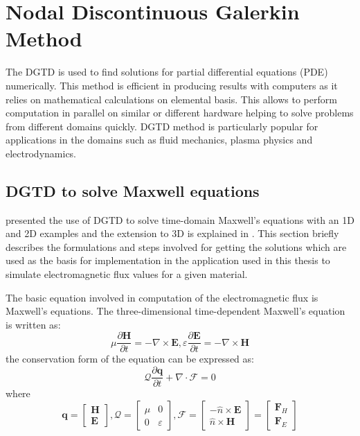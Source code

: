 \section{Nodal Discontinuous Galerkin Method}
\label{sec:dgtd}

The \ac{DGTD} \cite{hesthaven_nodal_2008} is used to find solutions
for partial differential equations (PDE) numerically. This method is efficient in
producing results with computers as it relies on mathematical calculations on elemental basis.
This allows to perform computation in parallel on similar or different hardware helping to
solve problems from different domains quickly. \ac{DGTD} method is particularly popular for applications
in the domains such as fluid mechanics, plasma physics and electrodynamics.

\subsection{DGTD to solve Maxwell equations}
\label{sec:dgtd_maxwell}

\textcite{Hesthaven_190449} presented the use of \ac{DGTD} to solve time-domain Maxwell's equations with
an 1D and 2D examples and the extension to 3D is explained in \cite{hesthaven_nodal_2008}. This section
briefly describes the formulations and steps involved for getting the solutions which are
used as the basis for implementation in the application used in this thesis to simulate
electromagnetic flux values for a given material.

The basic equation involved in computation of the electromagnetic flux is Maxwell's equations. The
three-dimensional time-dependent Maxwell's equation \cite{hesthaven_nodal_2008} is written as:
\begin{equation}\label{eqn:maxwellbase}
    \mu \frac{\partial{\textbf{H}}}{\partial{t}} = - \nabla \times \textbf{E},\varepsilon \frac{\partial{\textbf{E}}}{ \partial{t}} = - \nabla  \times \textbf{H}
\end{equation}
the conservation form of the equation can be expressed as:
\begin{equation}\label{eqn:maxwell}
    \mathcal{Q}\frac{\partial\textbf{q}}{\partial{t}}  + \nabla  \cdot \mathcal{F} = 0
\end{equation}
where
\begin{equation}\label{eqn:maxwellexpansion}
\textbf{q} =  \begin{bmatrix}\textbf{H} \\ \textbf{E} \end{bmatrix},
\mathcal{Q} =  \begin{bmatrix} \mu & 0 \\ 0 &  \varepsilon \end{bmatrix},
\mathcal{F} = \begin{bmatrix}  - \widehat{n} \times \textbf{E} \\ \widehat{n} \times \textbf{H} \end{bmatrix} = \begin{bmatrix} \textbf{F}_H \\ \textbf{F}_E \end{bmatrix}
\end{equation}

